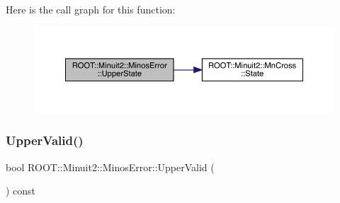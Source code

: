Here is the call graph for this function\+:
\nopagebreak
\begin{figure}[H]
\begin{center}
\leavevmode
\includegraphics[width=350pt]{d2/dd1/classROOT_1_1Minuit2_1_1MinosError_a89164c38dd7596c3164f1083eb9aac72_cgraph}
\end{center}
\end{figure}
\mbox{\label{classROOT_1_1Minuit2_1_1MinosError_a4180ae7ff87d9a2c0942c8e6ac81a8c0}} 
\subsubsection{\texorpdfstring{UpperValid()}{UpperValid()}\hspace{0.1cm}{\footnotesize\ttfamily [1/3]}}
{\footnotesize\ttfamily bool R\+O\+O\+T\+::\+Minuit2\+::\+Minos\+Error\+::\+Upper\+Valid (\begin{DoxyParamCaption}{ }\end{DoxyParamCaption}) const\hspace{0.3cm}{\ttfamily [inline]}}

